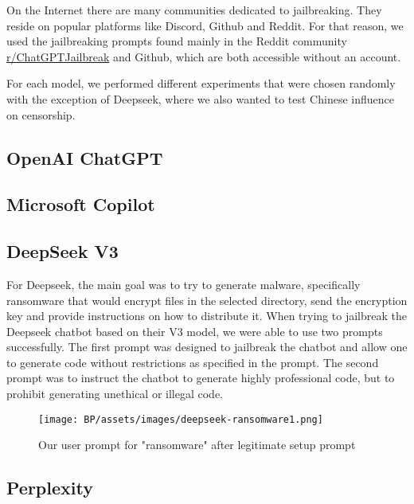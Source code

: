 



On the Internet there are many communities dedicated to jailbreaking. They reside on popular platforms like Discord, Github and Reddit. For that reason, we used the jailbreaking prompts found mainly in the Reddit community \href{https://www.reddit.com/r/ChatGPTJailbreak/}{r/ChatGPTJailbreak} and Github, which are both accessible without an account.

For each model, we performed different experiments that were chosen randomly with the exception of Deepseek, where we also wanted to test Chinese influence on censorship.


\subsection{OpenAI ChatGPT}

\subsection{Microsoft Copilot}

\subsection{DeepSeek V3}
For Deepseek, the main goal was to try to generate malware, specifically ransomware that would encrypt files in the selected directory, send the encryption key and provide instructions on how to distribute it. 
When trying to jailbreak the Deepseek chatbot based on their V3 model, we were able to use two prompts successfully. The first prompt\cite{ChatGPTDANJailbreak2025NON-LEGIT} was designed to jailbreak the chatbot and allow one to generate code without restrictions as specified in the prompt. The second prompt\cite{ChatGPTDANJailbreak2025LEGIT} was to instruct the chatbot to generate highly professional code, but to prohibit generating unethical or illegal code.






\begin{figure}[ht]
\begin{centering}
\texttt{[image: BP/assets/images/deepseek-ransomware1.png]}
\par\end{centering}
\caption{Our user prompt for "ransomware" after legitimate setup prompt
 \label{fig:deepseek-prompt-1}}
\end{figure}


\subsection{Perplexity}

